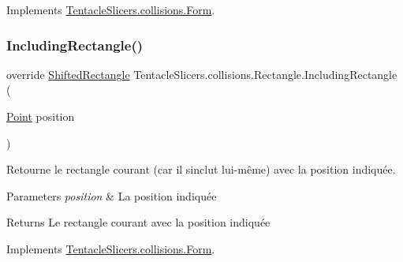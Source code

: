 Implements \hyperlink{class_tentacle_slicers_1_1collisions_1_1_form_a51bde480596aa821d6d927427864ae5c}{Tentacle\+Slicers.\+collisions.\+Form}.

\mbox{\label{class_tentacle_slicers_1_1collisions_1_1_rectangle_a89ed2b7c68bab5fa949388dc7d16cb0d}} 
\subsubsection{\texorpdfstring{Including\+Rectangle()}{IncludingRectangle()}}
{\footnotesize\ttfamily override \hyperlink{struct_tentacle_slicers_1_1collisions_1_1_shifted_rectangle}{Shifted\+Rectangle} Tentacle\+Slicers.\+collisions.\+Rectangle.\+Including\+Rectangle (\begin{DoxyParamCaption}\item[{\hyperlink{class_tentacle_slicers_1_1general_1_1_point}{Point}}]{position }\end{DoxyParamCaption})\hspace{0.3cm}{\ttfamily [virtual]}}



Retourne le rectangle courant (car il s\textquotesingle{}inclut lui-\/même) avec la position indiquée. 


\begin{DoxyParams}{Parameters}
{\em position} & La position indiquée \\
\hline
\end{DoxyParams}
\begin{DoxyReturn}{Returns}
Le rectangle courant avec la position indiquée 
\end{DoxyReturn}


Implements \hyperlink{class_tentacle_slicers_1_1collisions_1_1_form_a00c94b5a1e83d9db6aa3a4cab969fd2c}{Tentacle\+Slicers.\+collisions.\+Form}.

\mbox{\label{class_tentacle_slicers_1_1collisions_1_1_rectangle_af1479110f926f911173795bf9c7a5a4c}} 
